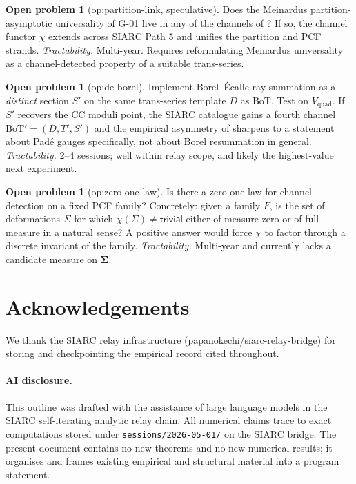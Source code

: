 \documentclass[11pt,reqno]{amsart}
\theoremstyle{plain}
\theoremstyle{definition}
\newtheorem{problem}[theorem]{Open problem}
\theoremstyle{remark}
\newcommand{\Sigmaspace}{\mathbf{\Sigma}}
\newcommand{\BoT}{\mathrm{BoT}}
\newcommand{\CC}{\mathrm{CC}}
\newcommand{\Vquad}{V_{\mathrm{quad}}}
\begin{document}
\begin{problem}[\textsf{op:partition-link}, speculative]
Does the Meinardus partition-asymptotic universality of G-01
\cite{meinardus1954asymptotische, andrews1976theory} live in
any of the channels of ? If so, the
channel functor $\chi$ extends across SIARC Path 5 and unifies
the partition and PCF strands.
\emph{Tractability.} Multi-year. Requires reformulating
Meinardus universality as a channel-detected property of a
suitable trans-series.
\end{problem}

\begin{problem}[\textsf{op:de-borel}]
Implement Borel--\'Ecalle ray summation
\cite{ecalle1981fonctions, sauzin2014resurgent} as a
\emph{distinct} section $S'$ on the same trans-series
template $D$ as $\BoT$. Test on $\Vquad$. If $S'$ recovers
the $\CC$ moduli point, the SIARC catalogue gains a fourth
channel $\BoT' = (D, T', S')$ and the empirical asymmetry of
 sharpens to a statement about Pad\'e
gauges specifically, not about Borel resummation in
general. \emph{Tractability.} 2--4 sessions; well within
relay scope, and likely the highest-value next experiment.
\end{problem}

\begin{problem}[\textsf{op:zero-one-law}]
Is there a zero-one law for channel detection on a fixed
PCF family? Concretely: given a family $F$, is the set of
deformations $\Sigma$ for which $\chi(\Sigma) \ne \mathsf{trivial}$
either of measure zero or of full measure in a natural
sense? A positive answer would force $\chi$ to factor through
a discrete invariant of the family.
\emph{Tractability.} Multi-year and currently lacks a
candidate measure on $\Sigmaspace$.
\end{problem}

\section*{Acknowledgements}

We thank the SIARC relay infrastructure
(\href{https://github.com/papanokechi/siarc-relay-bridge}%
{papanokechi/siarc-relay-bridge}) for storing and
checkpointing the empirical record cited throughout.

\paragraph{AI disclosure.} This outline was drafted with
the assistance of large language models in the SIARC
self-iterating analytic relay chain. All numerical claims
trace to exact computations stored under
\texttt{sessions/2026-05-01/} on the SIARC bridge. The
present document contains no new theorems and no new
numerical results; it organises and frames existing
empirical and structural material into a program statement.



\end{document}
